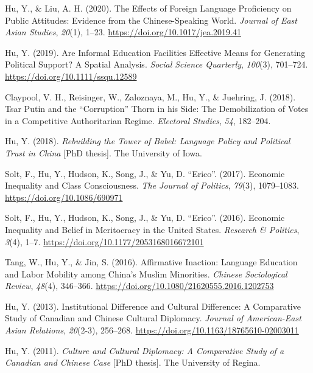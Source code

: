 \documentclass[11pt,a4paper,]{awesome-cv}
\begin{document}
\leavevmode{}%
Hu, Y., \& Liu, A. H. (2020). The Effects of Foreign Language
Proficiency on Public Attitudes: Evidence from the Chinese-Speaking
World. \emph{Journal of East Asian Studies}, \emph{20}(1), 1--23.
\url{https://doi.org/10.1017/jea.2019.41}

\leavevmode{}%
Hu, Y. (2019). Are Informal Education Facilities Effective Means for
Generating Political Support? A Spatial Analysis. \emph{Social Science
Quarterly}, \emph{100}(3), 701--724.
\url{https://doi.org/10.1111/ssqu.12589}

\leavevmode{}%
Claypool, V. H., Reisinger, W., Zaloznaya, M., Hu, Y., \& Juehring, J.
(2018). Tsar Putin and the {``Corruption''} Thorn in his Side: The
Demobilization of Votes in a Competitive Authoritarian Regime.
\emph{Electoral Studies}, \emph{54}, 182--204.

\leavevmode{}%
Hu, Y. (2018). \emph{Rebuilding the Tower of Babel: Language Policy and
Political Trust in China} {[}PhD thesis{]}. The University of Iowa.

\leavevmode{}%
Solt, F., Hu, Y., Hudson, K., Song, J., \& Yu, D. ``Erico''. (2017).
Economic Inequality and Class Consciousness. \emph{The Journal of
Politics}, \emph{79}(3), 1079--1083.
\url{https://doi.org/10.1086/690971}

\leavevmode{}%
Solt, F., Hu, Y., Hudson, K., Song, J., \& Yu, D. ``Erico''. (2016).
Economic Inequality and Belief in Meritocracy in the United States.
\emph{Research \& Politics}, \emph{3}(4), 1--7.
\url{https://doi.org/10.1177/2053168016672101}

\leavevmode{}%
Tang, W., Hu, Y., \& Jin, S. (2016). Affirmative Inaction: Language
Education and Labor Mobility among China's Muslim Minorities.
\emph{Chinese Sociological Review}, \emph{48}(4), 346--366.
\url{https://doi.org/10.1080/21620555.2016.1202753}

\leavevmode{}%
Hu, Y. (2013). Institutional Difference and Cultural Difference: A
Comparative Study of Canadian and Chinese Cultural Diplomacy.
\emph{Journal of American-East Asian Relations}, \emph{20}(2-3),
256--268. \url{https://doi.org/10.1163/18765610-02003011}

\leavevmode{}%
Hu, Y. (2011). \emph{Culture and Cultural Diplomacy: A Comparative Study
of a Canadian and Chinese Case} {[}PhD thesis{]}. The University of
Regina.
\end{document}
